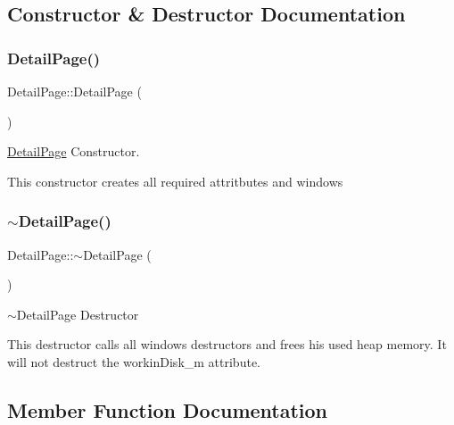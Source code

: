\subsection{Constructor \& Destructor Documentation}
\mbox{\label{class_detail_page_a151e61733c9f0cfbff77d58f161b15bf}} 
\subsubsection{\texorpdfstring{Detail\+Page()}{DetailPage()}}
{\footnotesize\ttfamily Detail\+Page\+::\+Detail\+Page (\begin{DoxyParamCaption}{ }\end{DoxyParamCaption})}



\mbox{\hyperlink{class_detail_page}{Detail\+Page}} Constructor. 

This constructor creates all required attritbutes and windows \mbox{\label{class_detail_page_ab50d547f466fa6b6bba924b79282aae1}} 
\subsubsection{\texorpdfstring{$\sim$\+Detail\+Page()}{~DetailPage()}}
{\footnotesize\ttfamily Detail\+Page\+::$\sim$\+Detail\+Page (\begin{DoxyParamCaption}{ }\end{DoxyParamCaption})\hspace{0.3cm}{\ttfamily [virtual]}}



$\sim$\+Detail\+Page Destructor 

This destructor calls all windows destructors and frees his used heap memory. It will not destruct the workin\+Disk\+\_\+m attribute. 

\subsection{Member Function Documentation}
\mbox{\label{class_detail_page_a2eba9774cf72106a5b87357c2348f5ae}} 
